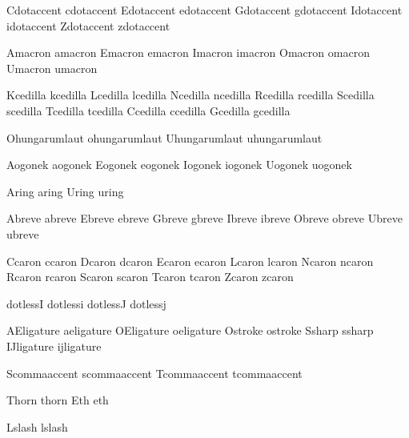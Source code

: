  Cdotaccent cdotaccent
 Edotaccent edotaccent
 Gdotaccent gdotaccent
 Idotaccent idotaccent
 Zdotaccent zdotaccent

 Amacron amacron
 Emacron emacron
 Imacron imacron
 Omacron omacron
 Umacron umacron

 Kcedilla kcedilla
 Lcedilla lcedilla
 Ncedilla ncedilla
 Rcedilla rcedilla
 Scedilla scedilla
 Tcedilla tcedilla
 Ccedilla ccedilla
 Gcedilla gcedilla

 Ohungarumlaut ohungarumlaut
 Uhungarumlaut uhungarumlaut

 Aogonek aogonek
 Eogonek eogonek
 Iogonek iogonek
 Uogonek uogonek

 Aring aring
 Uring uring

 Abreve abreve
 Ebreve ebreve
 Gbreve gbreve
 Ibreve ibreve
 Obreve obreve
 Ubreve ubreve

 Ccaron ccaron
 Dcaron dcaron
 Ecaron ecaron
 Lcaron lcaron
 Ncaron ncaron
 Rcaron rcaron
 Scaron scaron
 Tcaron tcaron
 Zcaron zcaron

 dotlessI dotlessi
 dotlessJ dotlessj

 AEligature aeligature
 OEligature oeligature
 Ostroke    ostroke
 Ssharp     ssharp
 IJligature ijligature

 Scommaaccent scommaaccent
 Tcommaaccent tcommaaccent

 Thorn  thorn
 Eth    eth

 Lslash lslash

\endinput

